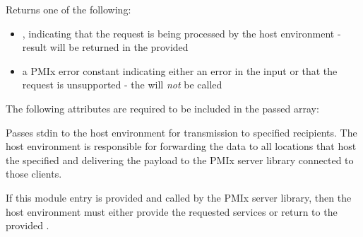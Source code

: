 \begin{arglist}
\end{arglist}

Returns one of the following:

\begin{itemize}
    \item {}, indicating that the request is being processed by the host environment - result will be returned in the provided 
    \item a PMIx error constant indicating either an error in the input or that the request is unsupported - the  will \textit{not} be called
\end{itemize}

\reqattrstart
The following attributes are required to be included in the passed  array:


\reqattrend

\descr

Passes stdin to the host environment for transmission to specified recipients. The host environment is responsible for forwarding the data to all locations that host the specified  and delivering the payload to the \ac{PMIx} server library connected to those clients.

\advicermstart
If this module entry is provided and called by the \ac{PMIx} server library, then the host environment must either provide the requested services or return  to the provided .
\advicermend

